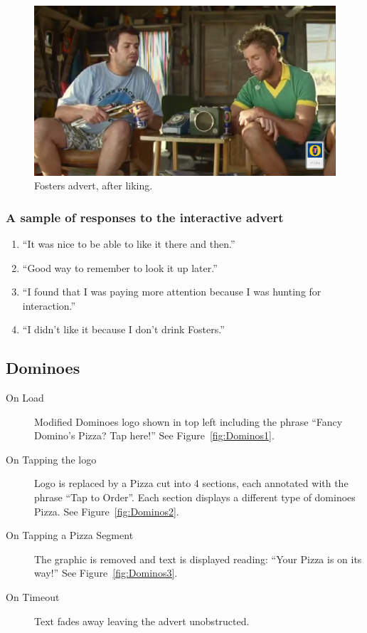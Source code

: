 	\begin{figure}[th]
		\centering
		\includegraphics[width=\textwidth,height=0.5\textheight,keepaspectratio]{images/adverts/fosters-2.png}
		\caption{Fosters advert, after liking.}
		\label{fig:fosters2}
	\end{figure}

	\subsubsection*{A sample of responses to the interactive advert}
	\begin{enumerate}
		\item{``It was nice to be able to like it there and then.''}
		\item{``Good way to remember to look it up later.''}
		\item{``I found that I was paying more attention because I was hunting for interaction.''}
		\item{``I didn't like it because I don't drink Fosters.''}
	\end{enumerate}

\clearpage
\subsection{Dominoes}
	\begin{description}
		\item[On Load]{Modified Dominoes logo shown in top left including the phrase ``Fancy Domino's Pizza? Tap here!'' See Figure~\ref{fig:Dominos1}.}
		\item[On Tapping the logo]{Logo is replaced by a Pizza cut into 4 sections, each annotated with the phrase ``Tap to Order''. Each section displays a different type of dominoes Pizza. See Figure~\ref{fig:Dominos2}.}
		\item[On Tapping a Pizza Segment]{The graphic is removed and text is displayed reading: ``Your Pizza is on its way!'' See Figure~\ref{fig:Dominos3}.}
		\item[On Timeout]{Text fades away leaving the advert unobstructed.}
	\end{description}

